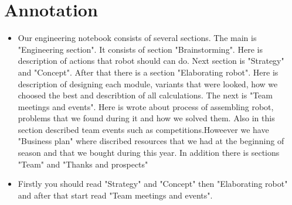 \section{Annotation}
\begin{itemize}
\item Our engineering notebook consists of several sections. The main is "Engineering section". It consists of section "Brainstorming". Here is description of actions that robot should can do. Next section is "Strategy" and "Concept". After that there is a section  "Elaborating robot". Here is description of designing each module, variants that were looked, how we choosed the best and describtion of all calculations. The next is "Team meetings and events". Here is wrote about process of assembling robot, problems that we found during it and how we solved them. Also in this section described team events such as competitions.Howeever we have "Business plan" where discribed resources that we had at the beginning of season and that we bought during this year. In addition there is sections "Team" and "Thanks and prospects"
\item Firstly you should read "Strategy" and "Concept" then "Elaborating robot" and after that start read "Team meetings and events".
\end{itemize}
\fillpage